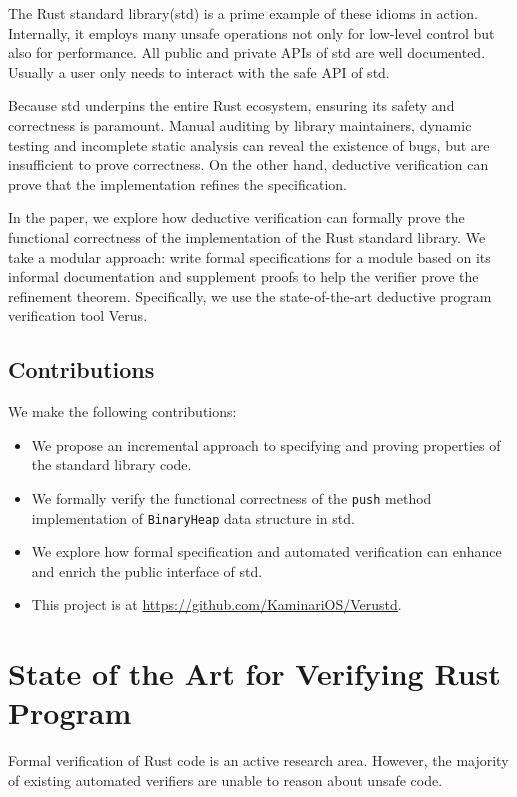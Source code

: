 \documentclass[conference]{IEEEtran}
\begin{document}
The Rust standard library(std) is a prime example of these idioms in action. Internally, it employs many unsafe operations not only for low-level control but also for performance. All public and private APIs of std are well documented. Usually a user only needs to interact with the safe API of std.  


Because std underpins the entire Rust ecosystem, ensuring its safety and correctness is paramount. Manual auditing by library maintainers, dynamic testing and incomplete static analysis can reveal the existence of bugs, but are insufficient to prove correctness. On the other hand, deductive verification can prove that the implementation refines the specification.           


In the paper, we explore how deductive verification can formally prove the functional correctness of the implementation of the Rust standard library. We take a modular approach: write formal specifications for a module based on its informal documentation and supplement proofs to help the verifier prove the refinement theorem. Specifically, we use the state-of-the-art deductive program verification tool Verus\cite{verus}. 

\subsection{Contributions}
We make the following contributions:
\begin{itemize}
        \item We propose an incremental approach to specifying and proving properties of the standard library code.
        \item We formally verify the functional correctness of the \texttt{push} method implementation of \texttt{BinaryHeap} data structure in std.
        \item We explore how formal specification and automated verification can enhance and enrich the public interface of std. 
        \item This project is at \href{https://github.com/KaminariOS/Verustd}{https://github.com/KaminariOS/Verustd}.
\end{itemize}
        
\section{State of the Art for Verifying Rust Program}
Formal verification of Rust code is an active research area. However, the majority of existing automated verifiers\cite{Prusti,Creusot} are unable to reason about unsafe code. 
\end{document}

